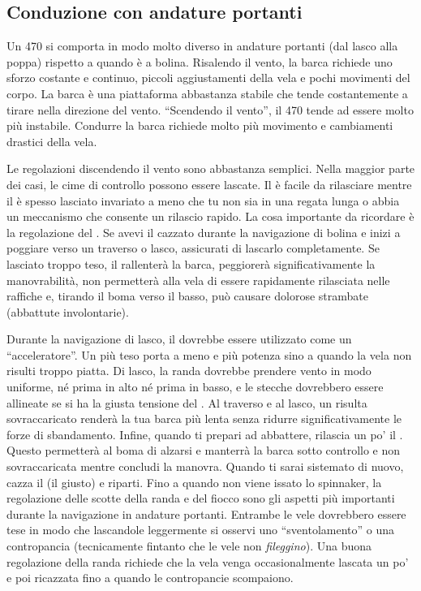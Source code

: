 
\subsection{Conduzione con andature portanti}
\label{sec:conduzione_andature_portanti}
Un 470 si comporta in modo molto diverso in andature portanti (dal lasco alla
poppa) rispetto a quando è a bolina. Risalendo il vento, la barca richiede uno
sforzo costante e continuo, piccoli aggiustamenti della vela e pochi movimenti
del corpo. La barca è una piattaforma abbastanza stabile che tende costantemente
a tirare nella direzione del vento. ``Scendendo il vento'', il 470 tende ad
essere molto più instabile. Condurre la barca richiede molto più movimento e
cambiamenti drastici della vela.

Le regolazioni discendendo il vento sono abbastanza semplici. Nella maggior
parte dei casi, le cime di controllo possono essere lascate. Il \cunningham è
facile da rilasciare mentre il \outhaul è spesso lasciato invariato a meno che
tu non sia in una regata lunga o abbia un meccanismo che consente un rilascio
rapido. La cosa importante da ricordare è la regolazione del \vang. Se avevi il
\vang cazzato durante la navigazione di bolina e inizi a poggiare verso un
traverso o lasco, assicurati di lascarlo completamente. Se lasciato troppo teso,
il \vang rallenterà la barca, peggiorerà significativamente la manovrabilità, non
permetterà alla vela di essere rapidamente rilasciata nelle raffiche e, tirando
il boma verso il basso, può causare dolorose strambate (abbattute involontarie).

Durante la navigazione di lasco, il \vang dovrebbe essere utilizzato come un
``acceleratore''. Un \vang più teso porta a meno \twist e più potenza sino a
quando la vela non risulti troppo piatta. Di lasco, la randa dovrebbe prendere
vento in modo uniforme, né prima in alto né prima in basso, e le stecche
dovrebbero essere allineate se si ha la giusta tensione del \vang. Al traverso e
al lasco, un \vang risulta sovraccaricato renderà la tua barca più lenta senza
ridurre significativamente le forze di sbandamento. Infine, quando ti prepari ad
abbattere, rilascia un po' il \vang. Questo permetterà al boma di alzarsi e
manterrà la barca sotto controllo e non sovraccaricata mentre concludi la
manovra. Quando ti sarai sistemato di nuovo, cazza il \vang (il giusto) e
riparti. Fino a quando non viene issato lo spinnaker, la regolazione delle
scotte della randa e del fiocco sono gli aspetti più importanti durante la
navigazione in andature portanti. Entrambe le vele dovrebbero essere tese in
modo che lascandole leggermente si osservi uno ``sventolamento'' o una
contropancia (tecnicamente fintanto che le vele non \emph{fileggino}). Una buona
regolazione della randa richiede che la vela venga occasionalmente lascata un
po' e poi ricazzata fino a quando le contropancie scompaiono.

